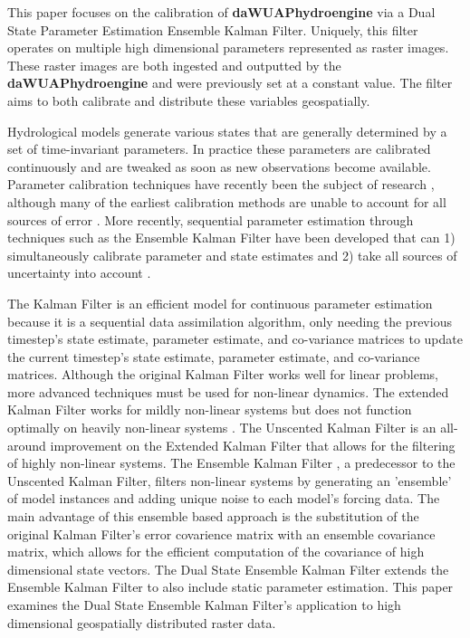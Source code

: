 \documentclass[utf8]{frontiersSCNS} %
\begin{document}
This paper focuses on the calibration of \textbf{daWUAPhydroengine} via a Dual State Parameter Estimation Ensemble Kalman Filter. Uniquely, this filter operates on multiple high dimensional parameters represented as raster images. These raster images are both ingested and outputted by the \textbf{daWUAPhydroengine} and were previously set at a constant value. The filter aims to both calibrate and distribute these variables geospatially. 

Hydrological models generate various states that are generally determined by a set of time-invariant parameters. In practice these parameters are calibrated continuously and are tweaked as soon as new observations become available. Parameter calibration techniques have recently been the subject of research \cite{Xie2010} \cite{Sorooshian1993}, although many of the earliest calibration methods are unable to account for all sources of error \cite{Evensen1994}. More recently, sequential parameter estimation through techniques such as the Ensemble Kalman Filter have been developed that can 1) simultaneously calibrate parameter and state estimates and 2) take all sources of uncertainty into account \cite{Evensen2003}.

The Kalman Filter is an efficient model for continuous parameter estimation because it is a sequential data assimilation algorithm, only needing the previous timestep's state estimate, parameter estimate, and co-variance matrices to update the current timestep's state estimate, parameter estimate, and co-variance matrices.  Although the original Kalman Filter \cite{Kalman1960} works well for linear problems, more advanced techniques must be used for non-linear dynamics. The extended Kalman Filter \cite{Jazwinski1970} works for mildly non-linear systems but does not function optimally on heavily non-linear systems \cite{Miller1994}. The Unscented Kalman Filter \cite{Julier1997} is an all-around improvement on the Extended Kalman Filter that allows for the filtering of highly non-linear systems. The Ensemble Kalman Filter \cite{Evensen1994}, a predecessor to the Unscented Kalman Filter, filters non-linear systems by generating an 'ensemble' of model instances and adding unique noise to each model's forcing data. The main advantage of this ensemble based approach is the substitution of the original Kalman Filter's error covarience matrix with an ensemble covariance matrix, which allows for the efficient computation of the covariance of high dimensional state vectors. The Dual State Ensemble Kalman Filter \cite{Moradkhani2005} extends the Ensemble Kalman Filter to also include static parameter estimation. This paper examines the Dual State Ensemble Kalman Filter's application to high dimensional geospatially distributed raster data.
\end{document}
